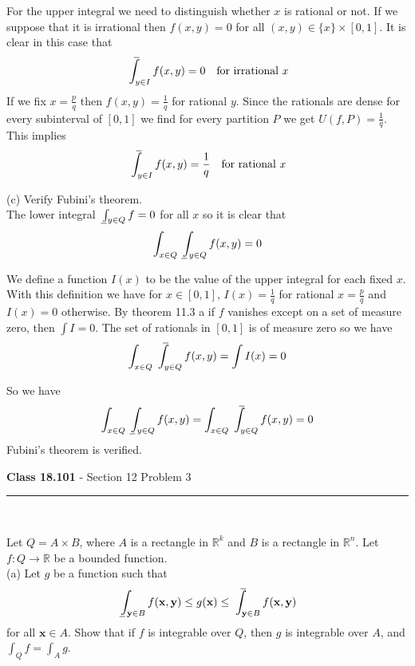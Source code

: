 \documentclass[11pt,reqno]{article}
\def\uint{\mathchoice%
    {\mkern13mu\overline{\vphantom{\intop}\mkern9mu}\mkern-20mu}%
    {\mkern9mu\overline{\vphantom{\intop}\mkern9mu}\mkern-14mu}%
    {\mkern9mu\overline{\vphantom{\intop}\mkern9mu}\mkern-14mu}%
    {\mkern9mu\overline{\vphantom{\intop}\mkern9mu}\mkern-14mu}%
  \int}
\def\lint{\mkern3mu\underline{\vphantom{\intop}\mkern9mu}\mkern-10mu\int}
\begin{document}
For the upper integral we need to distinguish whether $x$ is rational or not. If we suppose that it is irrational then $f(x,y) = 0$ for all $(x,y) \in \{x\} \times [0,1]$. It is clear in this case that 
\[  \uint_{y \in I} f(x,y)  = 0 \quad \text{for irrational $x$} \]
If we fix $x = \frac{p}{q}$ then $f(x,y) = \frac{1}{q}$ for rational $y$. Since the rationals are dense for every subinterval of $[0,1]$ we find for every partition $P$ we get $U(f,P) = \frac{1}{q}$. This implies
\[  \uint_{y \in I} f(x,y)  = \frac{1}{q} \quad \text{for rational $x$} \]

\noindent (c) Verify Fubini's theorem.\\

\noindent The lower integral $\lint_{y \in Q} f = 0$ for all $x$ so it is clear that 
\[ \int_{x \in Q} \lint_{y \in Q} f(x,y) = 0 \]

We define a function $I(x)$ to be the value of the upper integral for each fixed $x$. With this definition we have for $x \in [0,1]$, $I(x) = \frac{1}{q}$ for rational $x = \frac{p}{q}$ and $I(x) = 0$ otherwise. By theorem 11.3 a if $f$ vanishes except on a set of measure zero, then $\int I = 0$. The set of rationals in $[0,1]$ is of measure zero so we have 
\[ \int_{x \in Q} \uint_{y \in Q} f(x,y) =  \int I(x) = 0 \]

\noindent So we have 
\[  \int_{x \in Q} \lint_{y \in Q} f(x,y) = \int_{x \in Q} \uint_{y \in Q} f(x,y) = 0 \]
Fubini's theorem is verified.\\

\begin{flushleft} 
\textbf{Class 18.101} - Section 12 Problem 3\\
\rule{500pt}{1pt}\\
\end{flushleft} 

Let $Q = A \times B$, where $A$ is a rectangle in $\mathbb{R}^k$ and $B$ is a rectangle in $\mathbb{R}^n$. Let $f : Q \to \mathbb{R}$ be a bounded function.\\

\noindent (a) Let $g$ be a function such that
\[ \lint_{\textbf{y} \in B} f(\textbf{x},\textbf{y}) \le g(\textbf{x}) \le \uint_{\textbf{y} \in B} f(\textbf{x},\textbf{y}) \]
for all $\textbf{x} \in A$. Show that if $f$ is integrable over $Q$, then $g$ is integrable over $A$, and $\int_Q f = \int_A g$.\\
\end{document}
